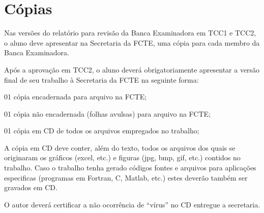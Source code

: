 \section{Cópias}

Nas versões do relatório para revisão da Banca Examinadora em TCC1 e TCC2, 
o aluno deve apresentar na Secretaria da FCTE, uma cópia para cada membro da 
Banca Examinadora.

Após a aprovação em TCC2, o aluno deverá obrigatoriamente apresentar a 
versão final de seu trabalho à Secretaria da FCTE na seguinte forma:

\begin{description}
	\item 01 cópia encadernada para arquivo na FCTE;
	\item 01 cópia não encadernada (folhas avulsas) para arquivo na FCTE;
	\item 01 cópia em CD de todos os arquivos empregados no trabalho;
\end{description}

A cópia em CD deve conter, além do texto, todos os arquivos dos quais se 
originaram os gráficos (excel, etc.) e figuras (jpg, bmp, gif, etc.) 
contidos no trabalho. Caso o trabalho tenha gerado códigos fontes e 
arquivos para aplicações especificas (programas em Fortran, C, Matlab, 
etc.) estes deverão também ser gravados em CD. 

O autor deverá certificar a não ocorrência de “vírus” no CD entregue a 
secretaria. 

